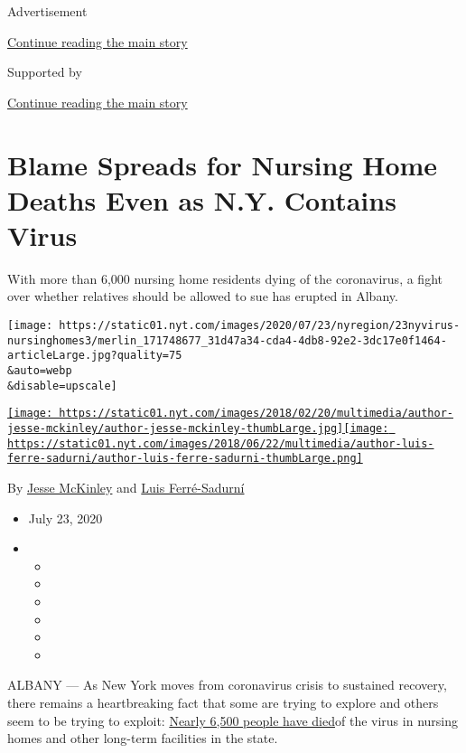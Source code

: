 Advertisement

\protect\hyperlink{after-top}{Continue reading the main story}

Supported by

\protect\hyperlink{after-sponsor}{Continue reading the main story}

\hypertarget{blame-spreads-for-nursing-home-deaths-even-as-ny-contains-virus}{%
\section{Blame Spreads for Nursing Home Deaths Even as N.Y. Contains
Virus}\label{blame-spreads-for-nursing-home-deaths-even-as-ny-contains-virus}}

With more than 6,000 nursing home residents dying of the coronavirus, a
fight over whether relatives should be allowed to sue has erupted in
Albany.

\texttt{[image: https://static01.nyt.com/images/2020/07/23/nyregion/23nyvirus-nursinghomes3/merlin\_171748677\_31d47a34-cda4-4db8-92e2-3dc17e0f1464-articleLarge.jpg?quality=75\\\&auto=webp\\\&disable=upscale]}

\href{https://www.nytimes.com/by/jesse-mckinley}{\texttt{[image: https://static01.nyt.com/images/2018/02/20/multimedia/author-jesse-mckinley/author-jesse-mckinley-thumbLarge.jpg]}}\href{https://www.nytimes.com/by/luis-ferre-sadurni}{\texttt{[image: https://static01.nyt.com/images/2018/06/22/multimedia/author-luis-ferre-sadurni/author-luis-ferre-sadurni-thumbLarge.png]}}

By \href{https://www.nytimes.com/by/jesse-mckinley}{Jesse McKinley} and
\href{https://www.nytimes.com/by/luis-ferre-sadurni}{Luis Ferré-Sadurní}

\begin{itemize}
\item
  July 23, 2020
\item
  \begin{itemize}
  \item
  \item
  \item
  \item
  \item
  \item
  \end{itemize}
\end{itemize}

ALBANY --- As New York moves from coronavirus crisis to sustained
recovery, there remains a heartbreaking fact that some are trying to
explore and others seem to be trying to exploit:
\href{https://www.nytimes.com/interactive/2020/us/coronavirus-nursing-homes.html}{Nearly
6,500 people have died}of the virus in nursing homes and other long-term
facilities in the state.

